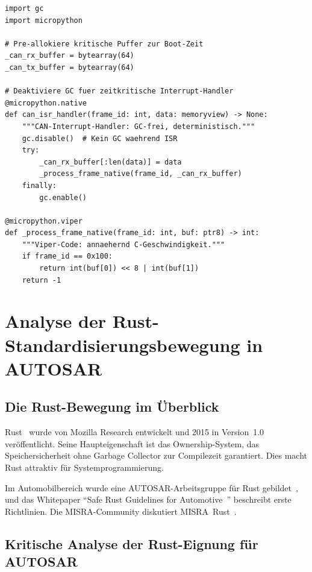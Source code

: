 ﻿\documentclass[12pt,a4paper,twoside]{article}
\begin{document}
\begin{lstlisting}[language=MicroPython,caption={MicroPython Speichermanagement für zeitkritische Funktionen},label=lst:gc_control]
import gc
import micropython

# Pre-allokiere kritische Puffer zur Boot-Zeit
_can_rx_buffer = bytearray(64)
_can_tx_buffer = bytearray(64)

# Deaktiviere GC fuer zeitkritische Interrupt-Handler
@micropython.native
def can_isr_handler(frame_id: int, data: memoryview) -> None:
    """CAN-Interrupt-Handler: GC-frei, deterministisch."""
    gc.disable()  # Kein GC waehrend ISR
    try:
        _can_rx_buffer[:len(data)] = data
        _process_frame_native(frame_id, _can_rx_buffer)
    finally:
        gc.enable()

@micropython.viper
def _process_frame_native(frame_id: int, buf: ptr8) -> int:
    """Viper-Code: annaehernd C-Geschwindigkeit."""
    if frame_id == 0x100:
        return int(buf[0]) << 8 | int(buf[1])
    return -1
\end{lstlisting}

\section{Analyse der Rust-Standardisierungsbewegung in AUTOSAR}
\label{sec:rust_analyse}

\subsection{Die Rust-Bewegung im Überblick}
Rust~\cite{rust_book2022} wurde von Mozilla Research entwickelt und 2015
in Version~1.0 veröffentlicht. Seine Haupteigenschaft ist das Ownership-System,
das Speichersicherheit ohne Garbage Collector zur Compilezeit garantiert.
Dies macht Rust attraktiv für Systemprogrammierung.

Im Automobilbereich wurde eine AUTOSAR-Arbeitsgruppe für Rust gebildet~\cite{autosar_wg_rustsafety},
und das Whitepaper ``Safe Rust Guidelines for Automotive~\cite{autosar_rust_wp2023}''
beschreibt erste Richtlinien. Die MISRA-Community diskutiert MISRA~Rust~\cite{misra_rust2022}.

\subsection{Kritische Analyse der Rust-Eignung für AUTOSAR}
\label{subsec:rust_kritik}
\end{document}
